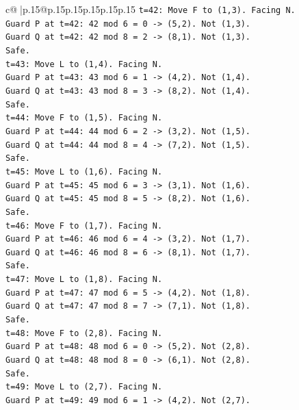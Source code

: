 \documentclass{article}
\begin{document}
{\begin{supertabular}{c@{$\;$}|p{.15\linewidth}@{}p{.15\linewidth}p{.15\linewidth}p{.15\linewidth}p{.15\linewidth}p{.15\linewidth}}
{{{\texttt{t=42: Move F to (1,3). Facing N.} \\
\texttt{Guard P at t=42: 42 mod 6 = 0 {-}> (5,2). Not (1,3).} \\
\texttt{Guard Q at t=42: 42 mod 8 = 2 {-}> (8,1). Not (1,3).} \\
\texttt{Safe.} \\
\texttt{t=43: Move L to (1,4). Facing N.} \\
\texttt{Guard P at t=43: 43 mod 6 = 1 {-}> (4,2). Not (1,4).} \\
\texttt{Guard Q at t=43: 43 mod 8 = 3 {-}> (8,2). Not (1,4).} \\
\texttt{Safe.} \\
\texttt{t=44: Move F to (1,5). Facing N.} \\
\texttt{Guard P at t=44: 44 mod 6 = 2 {-}> (3,2). Not (1,5).} \\
\texttt{Guard Q at t=44: 44 mod 8 = 4 {-}> (7,2). Not (1,5).} \\
\texttt{Safe.} \\
\texttt{t=45: Move L to (1,6). Facing N.} \\
\texttt{Guard P at t=45: 45 mod 6 = 3 {-}> (3,1). Not (1,6).} \\
\texttt{Guard Q at t=45: 45 mod 8 = 5 {-}> (8,2). Not (1,6).} \\
\texttt{Safe.} \\
\texttt{t=46: Move F to (1,7). Facing N.} \\
\texttt{Guard P at t=46: 46 mod 6 = 4 {-}> (3,2). Not (1,7).} \\
\texttt{Guard Q at t=46: 46 mod 8 = 6 {-}> (8,1). Not (1,7).} \\
\texttt{Safe.} \\
\texttt{t=47: Move L to (1,8). Facing N.} \\
\texttt{Guard P at t=47: 47 mod 6 = 5 {-}> (4,2). Not (1,8).} \\
\texttt{Guard Q at t=47: 47 mod 8 = 7 {-}> (7,1). Not (1,8).} \\
\texttt{Safe.} \\
\texttt{t=48: Move F to (2,8). Facing N.} \\
\texttt{Guard P at t=48: 48 mod 6 = 0 {-}> (5,2). Not (2,8).} \\
\texttt{Guard Q at t=48: 48 mod 8 = 0 {-}> (6,1). Not (2,8).} \\
\texttt{Safe.} \\
\texttt{t=49: Move L to (2,7). Facing N.} \\
\texttt{Guard P at t=49: 49 mod 6 = 1 {-}> (4,2). Not (2,7).} \\
}}}
\end{supertabular}}
\end{document}
